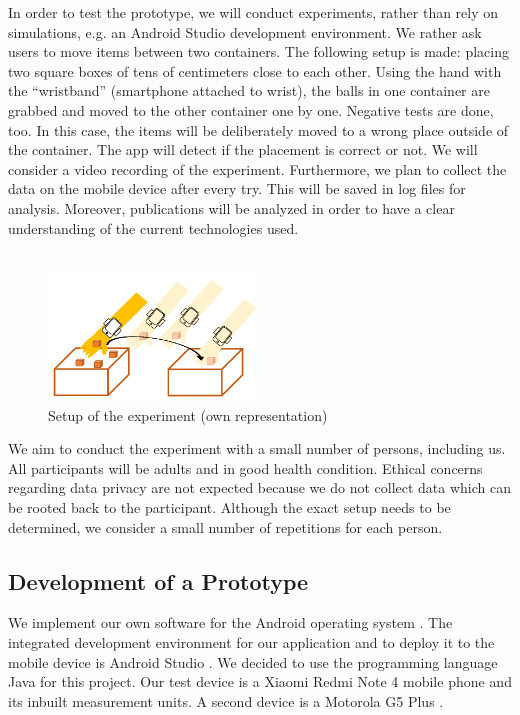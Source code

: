 \documentclass[12pt,twoside, hidelinks]{article}
\begin{document}
In order to test the prototype, we will conduct experiments, rather than rely on simulations, e.g. an Android Studio development environment. We rather ask users to move items between two containers. The following setup is made: placing two square boxes of tens of centimeters close to each other. Using the hand with the “wristband” (smartphone attached to wrist), the balls in one container are grabbed and moved to the other container one by one. Negative tests are done, too. In this case, the items will be deliberately moved to a wrong place outside of the container. The app will detect if the placement is correct or not. We will consider a video recording of the experiment. Furthermore, we plan to collect the data on the mobile device after every try. This will be saved in log files for analysis.
Moreover, publications will be analyzed in order to have a clear understanding of the current technologies used.
\\
\\

\begin{figure}[H]
	\begin{center}
		\includegraphics[width=0.5\textwidth]{figures/experiment_setup}
		\caption{Setup of the experiment (own representation)}
		\label{fig:experiment}
	\end{center}
\end{figure}

We aim to conduct the experiment with a small number of persons, including us. All participants will be adults and in good health condition. Ethical concerns regarding data privacy are not expected because we do not collect data which can be rooted back to the participant. Although the exact setup needs to be determined, we consider a small number of repetitions for each person.

\subsection{Development of a Prototype}
\label{sect:implementation}
We implement our own software for the Android operating system \cite{Android}. The integrated development environment for our application and to deploy it to the mobile device is Android Studio \cite{Android_Studio}. We decided to use the programming language Java \cite{Java} for this project. Our test device is a Xiaomi Redmi Note 4 mobile phone \cite{Redmi_Note4} and its inbuilt measurement units. A second device is a Motorola G5 Plus \cite{motoG5}.
\end{document}
